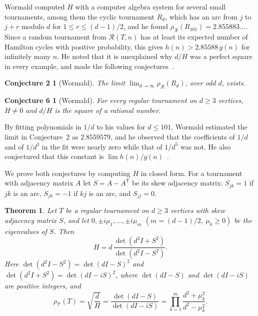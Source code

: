 \documentclass[11pt,a4paper,reqno]{amsart}
\newtheorem{theorem}{Theorem}[section]
\newtheorem*{conjTwo}{Conjecture 2}
\newtheorem*{conjSix}{Conjecture 6}
\theoremstyle{remark}
\numberwithin{equation}{section}
\newcommand{\T}{\mathsf{T}}
\newcommand{\cT}{\mathcal{T}}
\newcommand{\cR}{\mathcal{R}}
\begin{document}
Wormald computed $H$ with a computer algebra system for several small tournaments, among them the cyclic tournament $R_d$, which has an arc from $j$ to $j+r$ modulo $d$ for $1\le r\le (d-1)/2$, and he found $\rho_\cR(R_{101})=2.855883\ldots$. Since a random tournament from $\cR(T,n)$ has at least its expected number of Hamilton cycles with positive probability, this gives $h(n)>2.85588\,g(n)$ for infinitely many $n$. He noted that it is unexplained why $d/H$ was a perfect square in every example, and made the following conjectures~\cite[Conjectures~2 and~6]{W}.

\begin{conjTwo}[Wormald]
The limit $\lim_{d\to\infty}\rho_\cR(R_d)$, over odd $d$, exists.
\end{conjTwo}

\begin{conjSix}[Wormald]
For every regular tournament on $d\ge3$ vertices, $H\neq0$ and $d/H$ is the square of a rational number.
\end{conjSix}

By fitting polynomials in $1/d$ to his values for $d\le101$, Wormald estimated the limit in Conjecture~2 as $2.8559579$, and he observed that the coefficients of $1/d$ and of $1/d^3$ in the fit were nearly zero while that of $1/d^5$ was not. He also conjectured that this constant is $\lim h(n)/g(n)$~\cite[Conjecture~5]{W}.

We prove both conjectures by computing $H$ in closed form. For a tournament with adjacency matrix $A$ let $S=A-A^\T$ be its skew adjacency matrix: $S_{jk}=1$ if $jk$ is an arc, $S_{jk}=-1$ if $kj$ is an arc, and $S_{jj}=0$.

\begin{theorem}\label{thm:main}
Let $T$ be a regular tournament on $d\ge3$ vertices with skew adjacency matrix $S$, and let $0,\pm i\mu_1,\dots,\pm i\mu_m$ $(m=(d-1)/2,\ \mu_k\ge0)$ be the eigenvalues of $S$. Then
\begin{equation}\label{eq:main}
H=d\,\frac{\det(d^2I+S^2)}{\det(d^2I-S^2)}.
\end{equation}
Here $\det(d^2I-S^2)=\det(dI-S)^2$ and $\det(d^2I+S^2)=\det(dI-iS)^2$, where $\det(dI-S)$ and $\det(dI-iS)$ are positive integers, and
\begin{equation}\label{eq:rho}
\rho_\cT(T)=\sqrt{\frac dH}=\frac{\det(dI-S)}{\det(dI-iS)}=\prod_{k=1}^m\frac{d^2+\mu_k^2}{d^2-\mu_k^2}.
\end{equation}
\end{theorem}
\end{document}
